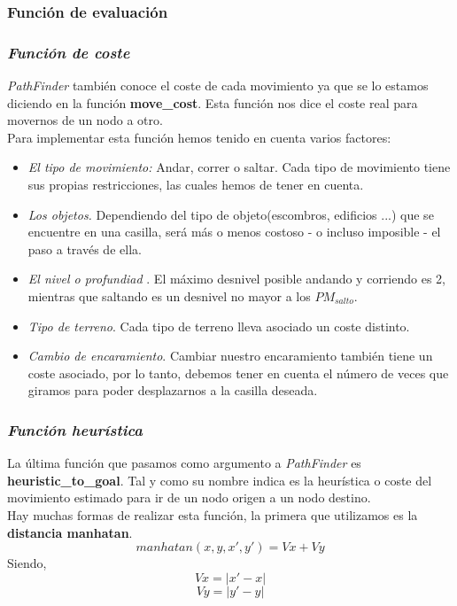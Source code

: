\documentclass[a4paper,12pt,oneside]{book}
\begin{document}
\subsubsection{Función de evaluación}

\subsubsection{{\it \bf Función de coste}}

{\it PathFinder} también conoce el coste de cada movimiento ya que se
lo estamos diciendo en la función {\bf move\_cost}. Esta función nos
dice el coste real para movernos de un nodo a otro. \\

Para implementar esta función hemos tenido en cuenta varios factores:
\begin{itemize}
\item {\it El tipo de movimiento:} Andar, correr o saltar. Cada tipo de
  movimiento tiene sus propias restricciones, las cuales hemos de tener en
  cuenta.
\item {\it Los objetos.} Dependiendo del tipo de objeto(escombros, edificios ...) que se encuentre en una
  casilla, será más o menos costoso - o incluso imposible - el paso a través de
  ella.
\item {\it El nivel o profundiad} . El máximo   desnivel posible andando y
  corriendo es 2, mientras que saltando es un desnivel no mayor a los
  $PM_{salto}$.
\item {\it Tipo de terreno}. Cada tipo de terreno lleva asociado un coste distinto.
\item {\it Cambio de encaramiento}. Cambiar nuestro encaramiento también tiene
  un coste asociado, por lo tanto, debemos tener en cuenta el número de veces
  que giramos para poder desplazarnos a la casilla deseada.
\end{itemize}


\subsubsection{{\it \bf Función heurística}}

La última función que pasamos como argumento a {\it PathFinder} es
{\bf heuristic\_to\_goal}. Tal y como su nombre indica es la
heurística o coste del movimiento estimado para ir de un nodo origen a
un nodo destino.\\

Hay muchas formas de realizar esta función, la primera que utilizamos
es la {\bf distancia manhatan}.
$$ manhatan(x,y, x',y') = Vx + Vy $$
Siendo,
$$Vx = |x'-x| $$
$$Vy = |y'-y| $$
\end{document}
